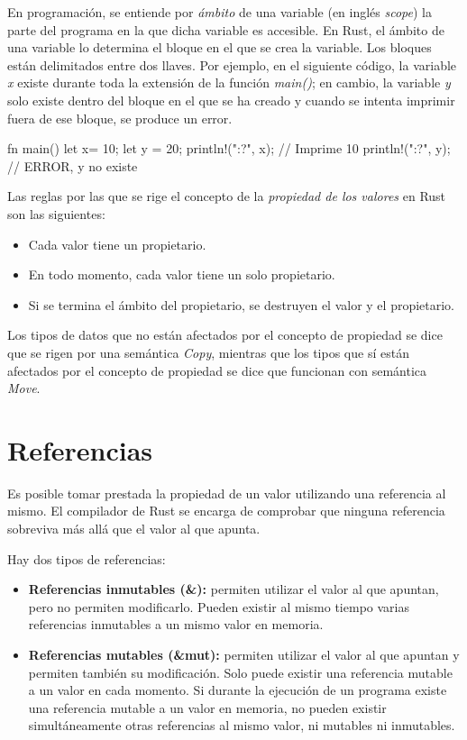 En programación, se entiende por \textit{ámbito} de una variable (en inglés \textit{scope}) la parte del programa en la que dicha variable es accesible. En Rust, el ámbito de una variable lo determina el bloque en el que se crea la variable. Los bloques están delimitados entre dos llaves. Por ejemplo, en el siguiente código, la variable \textit{x} existe durante toda la extensión de la función \textit{main()}; en cambio, la variable \textit{y} solo existe dentro del bloque en el que se ha creado y cuando se intenta imprimir fuera de ese bloque, se produce un error.

\vspace{0.7em}
\begin{Codigo}
fn main() {
   let x= 10;
   {
      let y = 20;
   }
   println!("{:?}", x); // Imprime 10
   println!("{:?}", y); // ERROR, y no existe
}
\end{Codigo}

Las reglas por las que se rige el concepto de la \textit{propiedad de los valores} en Rust son las siguientes:

\begin{itemize}
   \item Cada valor tiene un propietario.
   \item En todo momento, cada valor tiene un solo propietario.
   \item Si se termina el ámbito del propietario, se destruyen el valor y el propietario.
\end{itemize}

Los tipos de datos que no están afectados por el concepto de propiedad se dice que se rigen por una semántica \textit{Copy}, mientras que los tipos que sí están afectados por el concepto de propiedad se dice que funcionan con semántica \textit{Move}.

\section{Referencias}
Es posible tomar prestada la propiedad de un valor utilizando una referencia al mismo. El compilador de Rust se encarga de comprobar que ninguna referencia sobreviva más allá que el valor al que apunta.

Hay dos tipos de referencias:

\begin{itemize}
   \item \textbf{Referencias inmutables (\&):} permiten utilizar el valor al que apuntan, pero no permiten modificarlo. Pueden existir al mismo tiempo varias referencias inmutables a un mismo valor en memoria.
   \item \textbf{Referencias mutables (\&mut):} permiten utilizar el valor al que apuntan y permiten también su modificación. Solo puede existir una referencia mutable a un valor en cada momento. Si durante la ejecución de un programa existe una referencia mutable a un valor en memoria, no pueden existir simultáneamente otras referencias al mismo valor, ni mutables ni inmutables.
\end{itemize}

